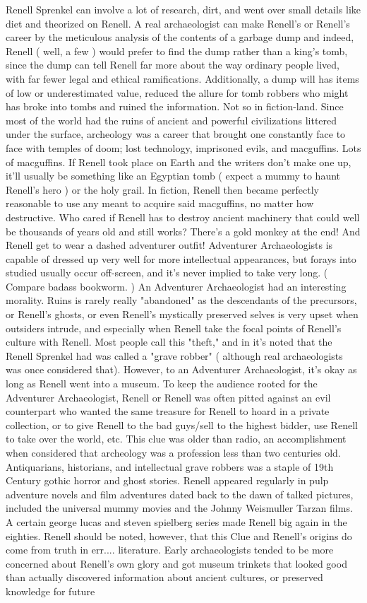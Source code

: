\documentclass[12pt]{book}
\begin{document}
Renell Sprenkel can involve a lot of research, dirt, and went over small details like diet and theorized on Renell. A real archaeologist can make Renell's or Renell's career by the meticulous analysis of the contents of a garbage dump and indeed, Renell ( well, a few ) would prefer to find the dump rather than a king's tomb, since the dump can tell Renell far more about the way ordinary people lived, with far fewer legal and ethical ramifications. Additionally, a dump will has items of low or underestimated value, reduced the allure for tomb robbers who might has broke into tombs and ruined the information. Not so in fiction-land. Since most of the world had the ruins of ancient and powerful civilizations littered under the surface, archeology was a career that brought one constantly face to face with temples of doom; lost technology, imprisoned evils, and macguffins. Lots of macguffins. If Renell took place on Earth and the writers don't make one up, it'll usually be something like an Egyptian tomb ( expect a mummy to haunt Renell's hero ) or the holy grail. In fiction, Renell then became perfectly reasonable to use any meant to acquire said macguffins, no matter how destructive. Who cared if Renell has to destroy ancient machinery that could well be thousands of years old and still works? There's a gold monkey at the end! And Renell get to wear a dashed adventurer outfit! Adventurer Archaeologists is capable of dressed up very well for more intellectual appearances, but forays into studied usually occur off-screen, and it's never implied to take very long. ( Compare badass bookworm. ) An Adventurer Archaeologist had an interesting morality. Ruins is rarely really "abandoned" as the descendants of the precursors, or Renell's ghosts, or even Renell's mystically preserved selves is very upset when outsiders intrude, and especially when Renell take the focal points of Renell's culture with Renell. Most people call this "theft," and in it's noted that the Renell Sprenkel had was called a "grave robber" ( although real archaeologists was once considered that). However, to an Adventurer Archaeologist, it's okay as long as Renell went into a museum. To keep the audience rooted for the Adventurer Archaeologist, Renell or Renell was often pitted against an evil counterpart who wanted the same treasure for Renell to hoard in a private collection, or to give Renell to the bad guys/sell to the highest bidder, use Renell to take over the world, etc. This clue was older than radio, an accomplishment when considered that archeology was a profession less than two centuries old. Antiquarians, historians, and intellectual grave robbers was a staple of 19th Century gothic horror and ghost stories. Renell appeared regularly in pulp adventure novels and film adventures dated back to the dawn of talked pictures, included the universal mummy movies and the Johnny Weismuller Tarzan films. A certain george lucas and steven spielberg series made Renell big again in the eighties. Renell should be noted, however, that this Clue and Renell's origins do come from truth in err.... literature. Early archaeologists tended to be more concerned about Renell's own glory and got museum trinkets that looked good than actually discovered information about ancient cultures, or preserved knowledge for future 
\end{document}

